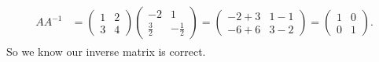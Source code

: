 \documentclass[letterpaper,10pt,english]{jupyterBook}
\begin{document}
\begin{equation*}
\begin{split} \begin{align*}
    AA^{-1} &=
    \begin{pmatrix} 1 & 2 \\ 3 & 4 \end{pmatrix}
    \begin{pmatrix} -2 & 1 \\ \frac{3}{2} & -\frac{1}{2} \end{pmatrix}
    =
    \begin{pmatrix} -2 + 3 & 1 - 1 \\ -6 + 6 & 3 - 2 \end{pmatrix}
    =
    \begin{pmatrix} 1 & 0 \\ 0 & 1 \end{pmatrix}.
\end{align*} \end{split}
\end{equation*}
\sphinxAtStartPar
So we know our inverse matrix is correct.
\end{document}
